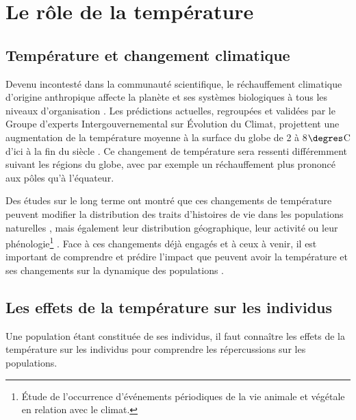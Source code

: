 \section{Le rôle de la température}

\subsection{Température et changement climatique}

Devenu incontesté dans la communauté scientifique, le réchauffement climatique
d'origine anthropique affecte la planète et ses systèmes biologiques à tous les
niveaux d'organisation \autocites{sagarin1999a,sala2000a,ipcc2007a,walther2002a}. Les
prédictions actuelles, regroupées et validées par le Groupe d’experts
Intergouvernemental sur \'{E}volution du Climat, projettent une augmentation de
la température moyenne à la surface du globe de 2 à 8$\degres$C d'ici à la fin
du siècle \autocites{ipcc2007a}. Ce changement de température sera ressenti
différemment suivant les régions du globe, avec par exemple un réchauffement
plus prononcé aux pôles qu'à l'équateur. 

Des études sur le long terme ont montré que ces changements de température
peuvent modifier la distribution des traits d'histoires de vie dans les
populations naturelles \autocites{parmesan2006a,ozgul2009a}, mais également leur
distribution géographique, leur activité ou leur phénologie\footnote{\'{E}tude
de l’occurrence d’événements périodiques de la vie animale et végétale en relation avec le climat.} \autocites{parmesan2006a,walther2002a}.
Face à ces changements déjà engagés et à ceux à venir, il est important de
comprendre et prédire l'impact que peuvent avoir la température et ses
changements sur la dynamique des populations \autocite{lavergne2010a}. 

\subsection{Les effets de la température sur les individus}

Une population étant constituée de ses individus, il faut connaître les effets
de la température sur les individus pour comprendre les répercussions sur les
populations. 


